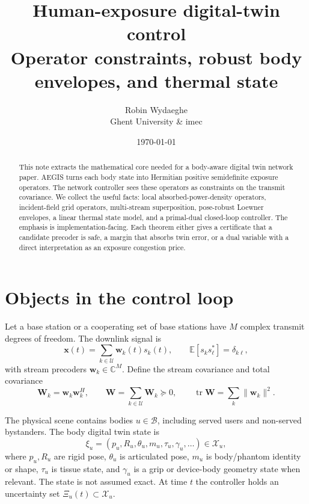 \documentclass[11pt,a4paper]{article}
\title{\textbf{Human-exposure digital-twin control}\\[0.25em]
  \large Operator constraints, robust body envelopes, and thermal state}
\author{Robin Wydaeghe \\[-0.2em] \small Ghent University \& imec}
\date{\today}
\theoremstyle{definition}
\theoremstyle{plain}
\newcommand{\xx}{\mathbf x}
\newcommand{\ww}{\mathbf w}
\newcommand{\W}{\mathbf W}
\newcommand{\Bodies}{\mathcal B}
\newcommand{\Users}{\mathcal U}
\newcommand{\States}{\mathcal X}
\newcommand{\Complex}{\mathbb C}
\newcommand{\tr}{\operatorname{tr}}
\begin{document}
\maketitle

\begin{abstract}
This note extracts the mathematical core needed for a body-aware digital
twin network paper.  AEGIS turns each body state into Hermitian positive
semidefinite exposure operators.  The network controller sees these
operators as constraints on the transmit covariance.  We collect the useful
facts: local absorbed-power-density operators, incident-field grid
operators, multi-stream superposition, pose-robust Loewner envelopes, a
linear thermal state model, and a primal-dual closed-loop controller.  The
emphasis is implementation-facing.  Each theorem either gives a certificate
that a candidate precoder is safe, a margin that absorbs twin error, or a
dual variable with a direct interpretation as an exposure congestion price.
\end{abstract}

\section{Objects in the control loop}

Let a base station or a cooperating set of base stations have $M$ complex
transmit degrees of freedom.  The downlink signal is
\begin{equation}
  \xx(t)=\sum_{k\in\Users}\ww_k(t)s_k(t),
  \qquad
  \mathbb E[s_k s_\ell^*]=\delta_{k\ell},
\end{equation}
with stream precoders $\ww_k\in\Complex^M$.  Define the stream covariance
and total covariance
\begin{equation}
  \W_k=\ww_k\ww_k^H,\qquad
  \W=\sum_{k\in\Users}\W_k\succeq0,\qquad
  \tr\W=\sum_k\|\ww_k\|^2.
\end{equation}

The physical scene contains bodies $u\in\Bodies$, including served users
and non-served bystanders.  The body digital twin state is
\begin{equation}
  \xi_u=(p_u,R_u,\theta_u,m_u,\tau_u,\gamma_u,\ldots)\in\States_u,
\end{equation}
where $p_u,R_u$ are rigid pose, $\theta_u$ is articulated pose,
$m_u$ is body/phantom identity or shape, $\tau_u$ is tissue state, and
$\gamma_u$ is a grip or device-body geometry state when relevant.  The
state is not assumed exact.  At time $t$ the controller holds an uncertainty
set $\Xi_u(t)\subset\States_u$.
\end{document}
